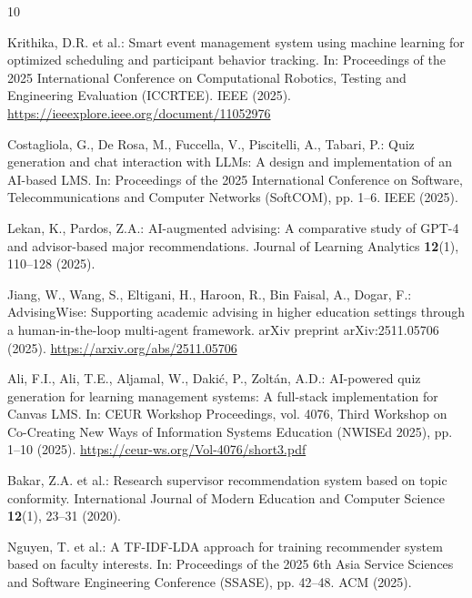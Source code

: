 \documentclass[runningheads]{llncs}
\begin{document}
\begin{thebibliography}{10}

Krithika, D.R. et al.: Smart event management system using machine learning for optimized scheduling and participant behavior tracking. In: Proceedings of the 2025 International Conference on Computational Robotics, Testing and Engineering Evaluation (ICCRTEE). IEEE (2025). \url{https://ieeexplore.ieee.org/document/11052976}

Costagliola, G., De Rosa, M., Fuccella, V., Piscitelli, A., Tabari, P.: Quiz generation and chat interaction with LLMs: A design and implementation of an AI-based LMS. In: Proceedings of the 2025 International Conference on Software, Telecommunications and Computer Networks (SoftCOM), pp. 1--6. IEEE (2025). 

Lekan, K., Pardos, Z.A.: AI-augmented advising: A comparative study of GPT-4 and advisor-based major recommendations. Journal of Learning Analytics \textbf{12}(1), 110--128 (2025). 

Jiang, W., Wang, S., Eltigani, H., Haroon, R., Bin Faisal, A., Dogar, F.: AdvisingWise: Supporting academic advising in higher education settings through a human-in-the-loop multi-agent framework. arXiv preprint arXiv:2511.05706 (2025). \url{https://arxiv.org/abs/2511.05706}

Ali, F.I., Ali, T.E., Aljamal, W., Daki\'c, P., Zolt\'an, A.D.: AI-powered quiz generation for learning management systems: A full-stack implementation for Canvas LMS. In: CEUR Workshop Proceedings, vol. 4076, Third Workshop on Co-Creating New Ways of Information Systems Education (NWISEd 2025), pp. 1--10 (2025). \url{https://ceur-ws.org/Vol-4076/short3.pdf}

Bakar, Z.A. et al.: Research supervisor recommendation system based on topic conformity. International Journal of Modern Education and Computer Science \textbf{12}(1), 23--31 (2020). 

Nguyen, T. et al.: A TF-IDF-LDA approach for training recommender system based on faculty interests. In: Proceedings of the 2025 6th Asia Service Sciences and Software Engineering Conference (SSASE), pp. 42--48. ACM (2025). 

\end{thebibliography}
\end{document}
